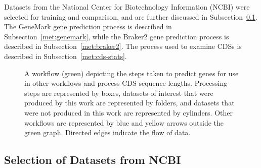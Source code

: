 Datasets from the National Center for Biotechnology Information (NCBI) were selected for training and comparison, and are further
discussed in Subsection~\ref{met:datasets}. The GeneMark gene prediction
process is described in Subsection~\ref{met:genemark}, while the Braker2
gene prediction process is described in Subsection~\ref{met:braker2}. The
process used to examine CDSs is described in Subsection~\ref{met:cds-stats}.

\begin{figure}
  \centering
  \caption[Gene prediction workflow]{A workflow (green) depicting the steps taken to predict
    genes for use in other workflows and process CDS sequence
    lengths. Processing steps are represented by boxes, datasets of
    interest that were produced by this work are represented by
    folders, and datasets that were not produced in this work are
    represented by cylinders. Other workflows are represented by blue
    and yellow arrows outside the green graph. Directed edges
    indicate the flow of data.}\label{fig:predict-workflow}
\end{figure}

\subsection{Selection of Datasets from NCBI}\label{met:datasets}

